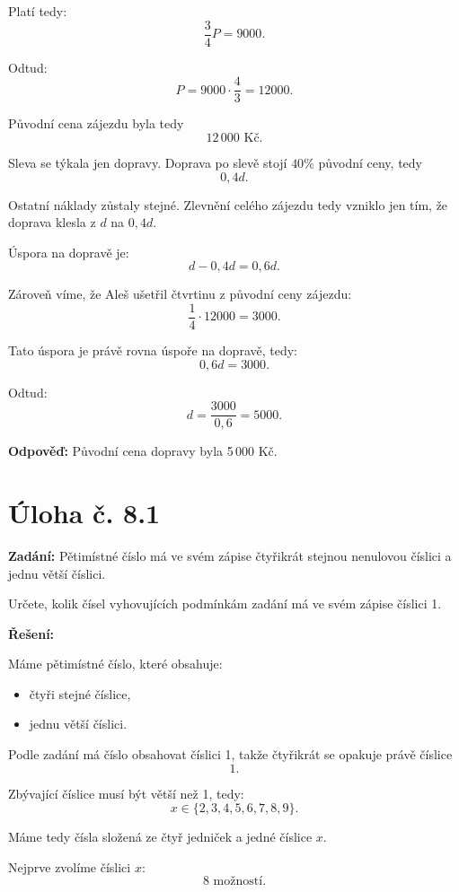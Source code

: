 \documentclass[12pt,a4paper]{article}
\begin{document}
Platí tedy:
\[
\frac{3}{4}P=9000.
\]

Odtud:
\[
P=9000\cdot \frac{4}{3}=12000.
\]

Původní cena zájezdu byla tedy
\[
12\,000\text{ Kč}.
\]

Sleva se týkala jen dopravy. Doprava po slevě stojí \(40\%\) původní ceny, tedy
\[
0{,}4d.
\]

Ostatní náklady zůstaly stejné. Zlevnění celého zájezdu tedy vzniklo jen tím, že doprava klesla z \(d\) na \(0{,}4d\).

Úspora na dopravě je:
\[
d-0{,}4d=0{,}6d.
\]

Zároveň víme, že Aleš ušetřil čtvrtinu z původní ceny zájezdu:
\[
\frac{1}{4}\cdot 12000 = 3000.
\]

Tato úspora je právě rovna úspoře na dopravě, tedy:
\[
0{,}6d=3000.
\]

Odtud:
\[
d=\frac{3000}{0{,}6}=5000.
\]

\bigskip

\textbf{Odpověď:}  
Původní cena dopravy byla 5\,000 Kč.


\newpage
\section*{Úloha č. 8.1}

\textbf{Zadání:}  
Pětimístné číslo má ve svém zápise čtyřikrát stejnou nenulovou číslici a jednu větší číslici.

Určete, kolik čísel vyhovujících podmínkám zadání má ve svém zápise číslici 1.

\bigskip

\textbf{Řešení:}

Máme pětimístné číslo, které obsahuje:
\begin{itemize}
    \item čtyři stejné číslice,
    \item jednu větší číslici.
\end{itemize}

Podle zadání má číslo obsahovat číslici 1, takže čtyřikrát se opakuje právě číslice
\[
1.
\]

Zbývající číslice musí být větší než 1, tedy:
\[
x \in \{2,3,4,5,6,7,8,9\}.
\]

Máme tedy čísla složená ze čtyř jedniček a jedné číslice \(x\).

\medskip

Nejprve zvolíme číslici \(x\):
\[
8 \text{ možností}.
\]
\end{document}
